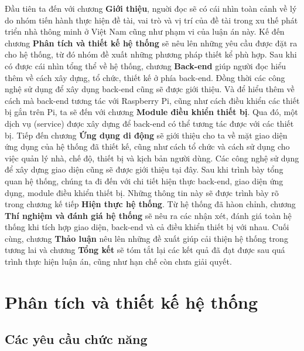 \documentclass[12pt,a4paper,oneside]{extbook}
\begin{document}
\noindent
Đầu tiên ta đến với chương \textbf{Giới thiệu}, nguời đọc sẽ có cái nhìn toàn cảnh về lý do nhóm tiến hành thực hiện đề tài, vai trò và vị trí của đề tài trong xu thế phát triển nhà thông minh ở Việt Nam cũng như phạm vi của luận án này. Kế đến chương \textbf{Phân tích và thiết kế hệ thống} sẽ nêu lên những yêu cầu được đặt ra cho hệ thống, từ đó nhóm đề xuất những phương pháp thiết kể phù hợp. Sau khi có được cái nhìn tổng thể về hệ thống, chương \textbf{Back-end} giúp người đọc hiểu thêm về cách xây dựng, tổ chức, thiết kế ở phía back-end. Đồng thời các công nghệ sử dụng để xây dụng back-end cũng sẽ được giới thiệu. Và để hiểu thêm về cách mà back-end tương tác với Raspberry Pi, cũng như cách điều khiển các thiết bị gắn trên Pi, ta sẽ đến với chương \textbf{Module điều khiển thiết bị}. Qua đó, một dịch vụ (service) được xây dựng để back-end có thể tương tác được với các thiết bị. Tiếp đến chương \textbf{Ứng dụng di động} sẽ giới thiệu cho ta về mặt giao diện ứng dụng của hệ thống đã thiết kế, cũng như cách tổ chức và cách sử dụng cho việc quản lý nhà, chế độ, thiết bị và kịch bản người dùng. Các công nghệ sử dụng để xây dựng giao diện cũng sẽ được giới thiệu tại đây. Sau khi trình bày tổng quan hệ thống, chúng ta đi đến với chi tiết hiện thực back-end, giao diện ứng dụng, module điều khiển thiết bị. Những thông tin này sẽ được trình bày rõ trong chương kế tiếp \textbf{Hiện thực hệ thống}. Từ hệ thống đã hàon chỉnh, chương \textbf{Thí nghiệm và đánh giá hệ thống} sẽ nêu ra các nhận xét, đánh giá toàn hệ thống khi tích hợp giao diện, back-end và cả điều khiển thiết bị với nhau. Cuối cùng, chương \textbf{Thảo luận} nêu lên những đề xuất giúp cải thiện hệ thống trong tương lai và chương \textbf{Tổng kết} sẽ tóm tắt lại các kết quả đã đạt được sau quá trình thực hiện luận án, cũng như hạn chế còn chưa giải quyết.
\chapter{Phân tích và thiết kế hệ thống}

\section{Các yêu cầu chức năng}
\end{document}
